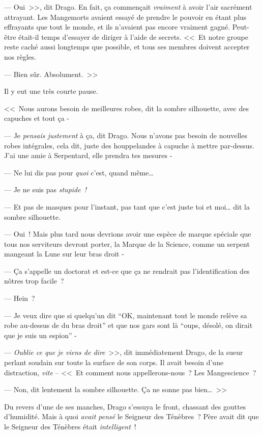 --- Oui~>>, dit Drago. En fait, ça commençait \emph{vraiment} à avoir l'air sacrément attrayant. Les Mangemorts avaient essayé de prendre le pouvoir en étant plus effrayants que tout le monde, et ils n'avaient pas encore vraiment gagné. Peut-être était-il temps d'essayer de diriger à l'aide de secrets. <<~Et notre groupe reste caché aussi longtemps que possible, et tous ses membres doivent accepter nos règles.

--- Bien sûr. Absolument.~>>

Il y eut une très courte pause.

<<~Nous aurons besoin de meilleures robes, dit la sombre silhouette, avec des capuches et tout ça -

--- Je \emph{pensais justement} à ça, dit Drago. Nous n'avons pas besoin de nouvelles robes intégrales, cela dit, juste des houppelandes à capuche à mettre par-dessus. J'ai une amie à Serpentard, elle prendra tes mesures -

--- Ne lui dis pas pour \emph{quoi} c'est, quand même…

--- Je ne suis pas \emph{stupide~!}

--- Et pas de masques pour l'instant, pas tant que c'est juste toi et moi… dit la sombre silhouette.

--- Oui~! Mais plus tard nous devrions avoir une espèce de marque spéciale que tous nos serviteurs devront porter, la Marque de la Science, comme un serpent mangeant la Lune sur leur bras droit -

--- Ça s'appelle un doctorat et est-ce que ça ne rendrait pas l'identification des nôtres trop facile~?

--- Hein~?

--- Je veux dire que si quelqu'un dit “OK, maintenant tout le monde relève sa robe au-dessus de du bras droit” et que nos gars sont là “oups, désolé, on dirait que je suis un espion” -

--- \emph{Oublie ce que je viens de dire}~>>, dit immédiatement Drago, de la sueur perlant soudain sur toute la surface de son corps. Il avait besoin d'une distraction, \emph{vite} -- <<~Et comment nous appellerons-nous~? Les Mangescience~?

--- Non, dit lentement la sombre silhouette. Ça ne sonne pas bien…~>>

Du revers d'une de ses manches, Drago s'essuya le front, chassant des gouttes d'humidité. Mais à quoi \emph{avait pensé} le Seigneur des Ténèbres~? Père avait dit que le Seigneur des Ténèbres était \emph{intelligent}~!

